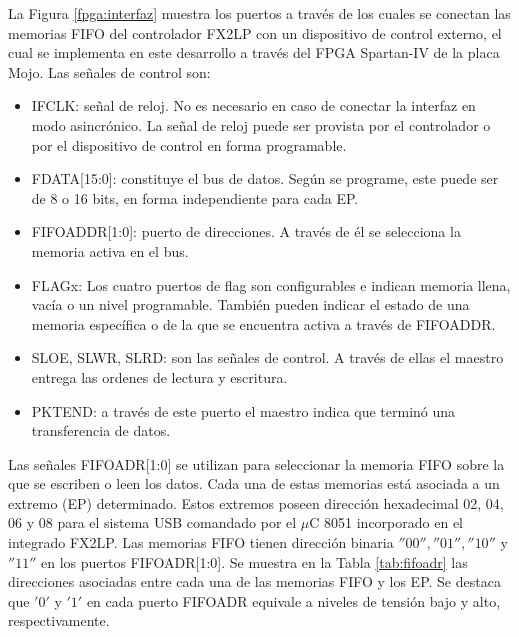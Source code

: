 	La Figura \ref{fpga:interfaz} muestra los puertos a través de los cuales se conectan las memorias FIFO del controlador FX2LP con un dispositivo de control externo, el cual se implementa en este desarrollo a través del FPGA Spartan-IV de la placa Mojo. Las señales de control son:
		
	\begin{itemize}
		\item IFCLK: señal de reloj. No es necesario en caso de conectar la interfaz en modo asincrónico. La señal de reloj puede ser provista por el controlador o por el dispositivo de control en forma programable.
		\item FDATA[15:0]: constituye el bus de datos. Según se programe, este puede ser de 8 o 16 bits, en forma independiente para cada EP.
		\item FIFOADDR[1:0]: puerto de direcciones. A través de él se selecciona la memoria activa en el bus.
		\item FLAGx: Los cuatro puertos de flag son configurables e indican memoria llena, vacía o un nivel programable. También pueden indicar el estado de una memoria específica o de la que se encuentra activa a través de FIFOADDR.
		\item SLOE, SLWR, SLRD: son las señales de control. A través de ellas el maestro entrega las ordenes de lectura y escritura.
		\item PKTEND: a través de este puerto el maestro indica que terminó una transferencia de datos.
	\end{itemize}
	
	
	Las señales FIFOADR[1:0] se utilizan para seleccionar la memoria FIFO sobre la que se escriben o leen los datos. Cada una de estas memorias está asociada a un extremo (EP) determinado. Estos extremos poseen dirección hexadecimal 02, 04, 06 y 08 para el sistema USB comandado por el $\mu$C 8051 incorporado en el integrado FX2LP. Las memorias FIFO tienen dirección binaria $''00'', ''01'', ''10''$ y $''11''$ en los puertos FIFOADR[1:0]. Se muestra en la Tabla \ref{tab:fifoadr} las direcciones asociadas entre cada una de las memorias FIFO y los EP. Se destaca que $'0'$ y $'1'$ en cada puerto FIFOADR equivale a niveles de tensión bajo y alto, respectivamente.
	
